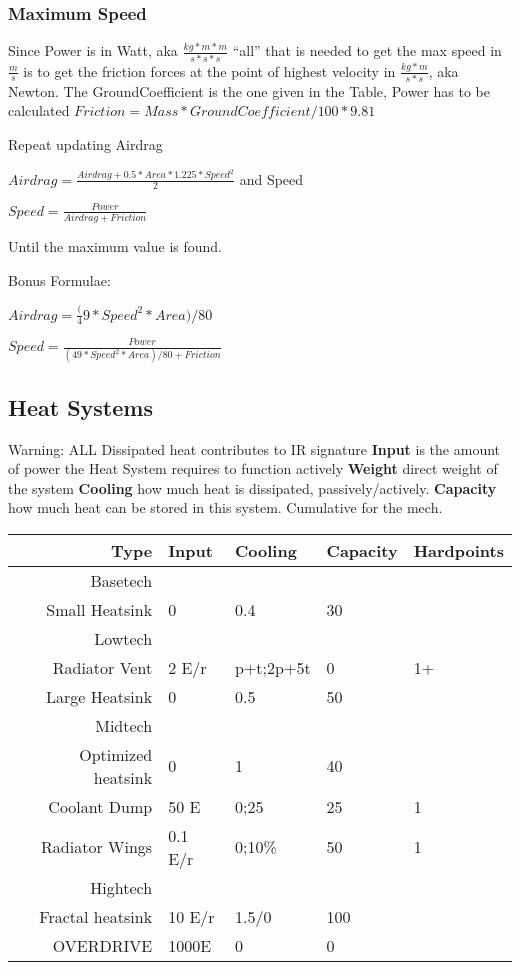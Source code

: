 \subsubsection{Maximum Speed}
Since Power is in Watt, aka
\(\frac{kg*m*m}{s*s*s}\)
``all'' that is needed to get the max speed in
\(\frac{m}{s}\) is to get
the friction forces at the point of highest velocity in \(\frac{kg*m}{s*s}\), aka Newton.
The GroundCoefficient is the one given in the Table, Power has to be calculated
\(Friction = Mass* GroundCoefficient/100 * 9.81\)\par
Repeat updating Airdrag\par
\(Airdrag = \frac{Airdrag + 0.5*Area*1.225 * Speed^2}{2}\)
and Speed\par
\(Speed = \frac{Power}{Airdrag + Friction}\)\par
Until the maximum value is found.\par
Bonus Formulae:\par
\(Airdrag = \frac(49*Speed^2*Area)/80 \) \par
\(Speed = \frac{Power}{(49*Speed^2*Area)/80 + Friction}\)


\subsection{Heat Systems}\label{subsec:heat-systems}
Warning: ALL Dissipated heat contributes to IR signature
\textbf{Input} is the amount of power the Heat System requires to function actively
\textbf{Weight} direct weight of the system
\textbf{Cooling} how much heat is dissipated, passively/actively.
\textbf{Capacity} how much heat can be stored in this system.
Cumulative for the mech.

\begin{tabular}{r|llll}
    Type & Input & Cooling & Capacity & Hardpoints\\
    \hline Basetech\\
    Small Heatsink & 0 & 0.4 & 30 & \\
    \hline Lowtech\\
    Radiator Vent & 2 E/r & p+t;2p+5t & 0 & 1+\\
    Large Heatsink & 0 & 0.5 & 50 & \\
    \hline Midtech\\
    Optimized heatsink  & 0 & 1 & 40 & \\
    Coolant Dump  & 50 E & 0;25 & 25 & 1 \\
    Radiator Wings & 0.1 E/r & 0;10\% & 50 & 1\\
    \hline Hightech\\
    Fractal heatsink & 10 E/r & 1.5/0 & 100 & \\
    OVERDRIVE & 1000E & 0 &  0 & \\
\end{tabular}

